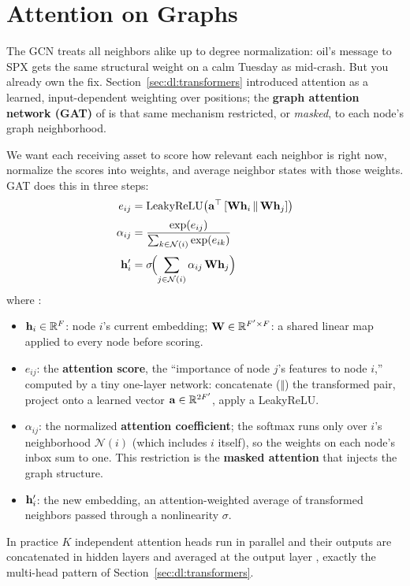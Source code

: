 \section{Attention on Graphs}\label{sec:gnn:attention}

The GCN treats all neighbors alike up to degree normalization: oil's message to SPX gets the same structural weight on a calm Tuesday as mid-crash. But you already own the fix. Section~\ref{sec:dl:transformers} introduced attention as a learned, input-dependent weighting over positions; the \textbf{graph attention network (GAT)} of \citet{Velickovic2018GAT} is that same mechanism restricted, or \emph{masked}, to each node's graph neighborhood.

We want each receiving asset to score how relevant each neighbor is right now, normalize the scores into weights, and average neighbor states with those weights. GAT does this in three steps:
\begin{align}
  e_{ij} &= \operatorname{LeakyReLU}\!\left(\mathbf{a}^\top \left[\mathbf{W}\mathbf{h}_i \,\Vert\, \mathbf{W}\mathbf{h}_j\right]\right) \label{eq:gnn:gat-score}\\[2pt]
  \alpha_{ij} &= \frac{\exp(e_{ij})}{\sum_{k \in \mathcal{N}(i)} \exp(e_{ik})} \label{eq:gnn:gat-softmax}\\[2pt]
  \mathbf{h}'_i &= \sigma\!\Bigl(\sum_{j \in \mathcal{N}(i)} \alpha_{ij}\, \mathbf{W} \mathbf{h}_j\Bigr) \label{eq:gnn:gat-agg}
\end{align}
where \citep[eqs.~1--4, pp.~3--4]{Velickovic2018GAT}:
\begin{itemize}[nosep]
  \item $\mathbf{h}_i \in \mathbb{R}^{F}$: node $i$'s current embedding; $\mathbf{W} \in \mathbb{R}^{F' \times F}$: a shared linear map applied to every node before scoring.
  \item $e_{ij}$: the \textbf{attention score}, the ``importance of node $j$'s features to node $i$,'' computed by a tiny one-layer network: concatenate ($\Vert$) the transformed pair, project onto a learned vector $\mathbf{a} \in \mathbb{R}^{2F'}$, apply a LeakyReLU.
  \item $\alpha_{ij}$: the normalized \textbf{attention coefficient}; the softmax runs only over $i$'s neighborhood $\mathcal{N}(i)$ (which includes $i$ itself), so the weights on each node's inbox sum to one. This restriction is the \textbf{masked attention} that injects the graph structure.
  \item $\mathbf{h}'_i$: the new embedding, an attention-weighted average of transformed neighbors passed through a nonlinearity $\sigma$.
\end{itemize}
In practice $K$ independent attention heads run in parallel and their outputs are concatenated in hidden layers and averaged at the output layer \citep[eqs.~5--6, p.~4]{Velickovic2018GAT}, exactly the multi-head pattern of Section~\ref{sec:dl:transformers}.

